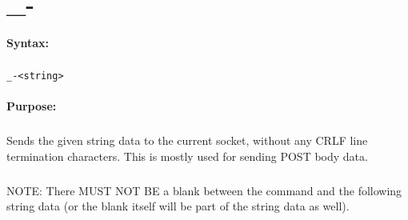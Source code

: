 
\newpage
\section{\_-}
\label{cmd:_-}

\paragraph{Syntax:}
\subparagraph{}
\texttt{\_-<string>}

\paragraph{Purpose:}
\subparagraph{}
Sends the given string data to the current socket, without any 
CRLF line termination characters. This is mostly used for 
sending POST body data.

\subparagraph{}
NOTE: There MUST NOT BE a blank between the command and the 
following string data (or the blank itself will be part of the 
string data as well).